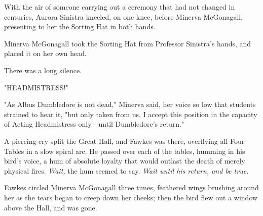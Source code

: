 With the air of someone carrying out a ceremony that had not changed in
centuries, Aurora Sinistra kneeled, on one knee, before Minerva McGonagall,
presenting to her the Sorting Hat in both hands.

Minerva McGonagall took the Sorting Hat from Professor Sinistra's hands, and
placed it on her own head.

There was a long silence.

"HEADMISTRESS!"

"As Albus Dumbledore is not dead," Minerva said, her voice so low that students
strained to hear it, "but only taken from us, I accept this position in the
capacity of Acting Headmistress only—until Dumbledore's return."

A piercing cry split the Great Hall, and Fawkes was there, overflying all Four
Tables in a slow spiral arc. He passed over each of the tables, humming in his
bird's voice, a hum of absolute loyalty that would outlast the death of merely
physical fires. \emph{Wait,} the hum seemed to say. \emph{Wait until his
return, and be true.}

Fawkes circled Minerva McGonagall three times, feathered wings brushing around
her as the tears began to creep down her cheeks; then the bird flew out a
window above the Hall, and was gone.
